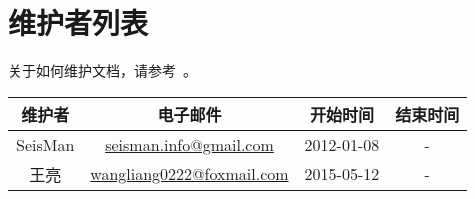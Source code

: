 {\section*{维护者列表}}

关于如何维护文档，请参考~。

\begin{table}[H]
\centering
\begin{tabular}{cccc}
\toprule
维护者      & 电子邮件                               &   开始时间    &   结束时间    \\
\midrule
SeisMan     & \small{\url{seisman.info@gmail.com}}   &  2012-01-08   &   -           \\
王亮     & \small{\url{wangliang0222@foxmail.com}}   &  2015-05-12   &   -           \\
\bottomrule
\end{tabular}
\end{table}
